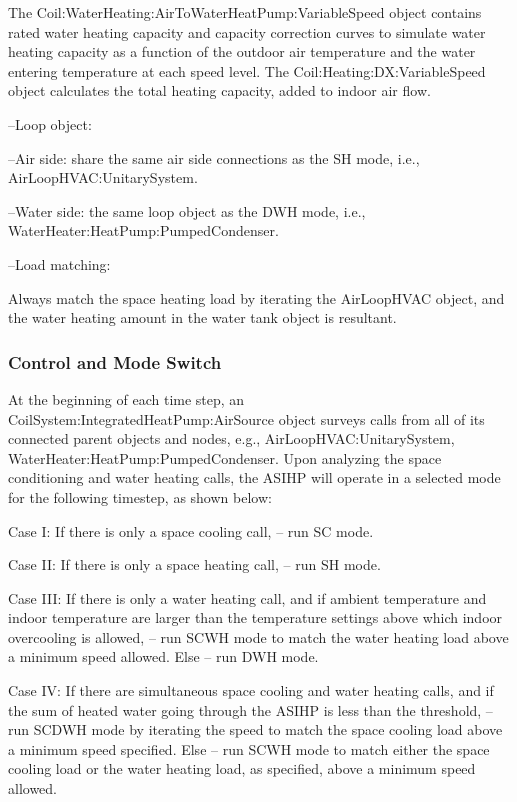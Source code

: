 The Coil:WaterHeating:AirToWaterHeatPump:VariableSpeed object contains rated water heating capacity and capacity correction curves to simulate water heating capacity as a function of the outdoor air temperature and the water entering temperature at each speed level. The Coil:Heating:DX:VariableSpeed object calculates the total heating capacity, added to indoor air flow.

--Loop object:

--Air side: share the same air side connections as the SH mode, i.e., AirLoopHVAC:UnitarySystem.

--Water side: the same loop object as the DWH mode, i.e., WaterHeater:HeatPump:PumpedCondenser.

--Load matching:

Always match the space heating load by iterating the AirLoopHVAC object, and the water heating amount in the water tank object is resultant.

\subsubsection{Control and Mode Switch}\label{Control-and-Mode-Switch-ASIHP}

At the beginning of each time step, an CoilSystem:IntegratedHeatPump:AirSource object surveys calls from all of its connected parent objects and nodes, e.g.,  AirLoopHVAC:UnitarySystem, WaterHeater:HeatPump:PumpedCondenser. Upon analyzing the space conditioning and water heating calls, the ASIHP will operate in a selected mode for the following timestep, as shown below:

Case I:
If there is only a space cooling call, – run SC mode.

Case II:
If there is only a space heating call, – run SH mode.

Case III:
If there is only a water heating call, and if ambient temperature and indoor temperature are larger than the temperature settings above which indoor overcooling is allowed, – run SCWH mode to match the water heating load above a minimum speed allowed.
Else – run DWH mode.

Case IV:
If there are simultaneous space cooling and water heating calls, and if the sum of heated water going through the ASIHP is less than the threshold, – run SCDWH mode by iterating the speed to match the space cooling load above a minimum speed specified.
Else – run SCWH mode to match either the space cooling load or the water heating load, as specified, above a minimum speed allowed.


